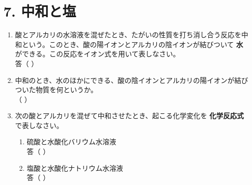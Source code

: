 \section*{7. 中和と塩}
\begin{enumerate}
    \item 酸とアルカリの水溶液を混ぜたとき、たがいの性質を打ち消し合う反応を中和という。このとき、酸の陽イオンとアルカリの陰イオンが結びついて \textbf{水} ができる。この反応をイオン式を用いて表しなさい。\\[0.2cm]
    答（ \hspace{10cm} ）
    \item 中和のとき、水のほかにできる、酸の陰イオンとアルカリの陽イオンが結びついた物質を何というか。\\[0.2cm]
    （ \hspace{5cm} ）
    \item 次の酸とアルカリを混ぜて中和させたとき、起こる化学変化を \textbf{化学反応式} で表しなさい。
    \begin{enumerate}
        \item 硫酸と水酸化バリウム水溶液 \\[0.3cm]
        答（ \hspace{12cm} ）\\[0.3cm]
        \item 塩酸と水酸化ナトリウム水溶液 \\[0.3cm]
        答（ \hspace{12cm} ）
    \end{enumerate}
\end{enumerate}
